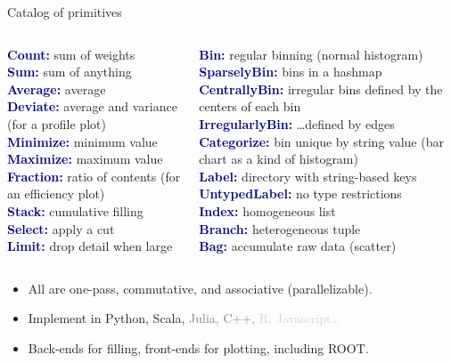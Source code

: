 \documentclass{beamer}
\begin{document}
\begin{frame}{Catalog of primitives}

\vspace{0.5 cm}
\begin{columns}
\textcolor{darkblue}{\bf Count:} sum of weights \\
\textcolor{darkblue}{\bf Sum:} sum of anything \\
\textcolor{darkblue}{\bf Average:} average \\
\textcolor{darkblue}{\bf Deviate:} average and variance (for a profile plot) \\
\textcolor{darkblue}{\bf Minimize:} minimum value \\
\textcolor{darkblue}{\bf Maximize:} maximum value \\
\textcolor{darkblue}{\bf Fraction:} ratio of contents (for an efficiency plot) \\
\textcolor{darkblue}{\bf Stack:} cumulative filling \\
\textcolor{darkblue}{\bf Select:} apply a cut \\
\textcolor{darkblue}{\bf Limit:} drop detail when large

\textcolor{darkblue}{\bf Bin:} regular binning (normal histogram) \\
\textcolor{darkblue}{\bf SparselyBin:} bins in a hashmap \\
\textcolor{darkblue}{\bf CentrallyBin:} irregular bins defined by the centers of each bin \\
\textcolor{darkblue}{\bf IrregularlyBin:} \ldots defined by edges \\
\textcolor{darkblue}{\bf Categorize:} bin unique by string value (bar chart as a kind of histogram) \\
\textcolor{darkblue}{\bf Label:} directory with string-based keys \\
\textcolor{darkblue}{\bf UntypedLabel:} no type restrictions \\
\textcolor{darkblue}{\bf Index:} homogeneous list \\
\textcolor{darkblue}{\bf Branch:} heterogeneous tuple \\
\textcolor{darkblue}{\bf Bag:} accumulate raw data (scatter) \\
\end{columns}

\vspace{0.25 cm}
\begin{itemize}
\item All are one-pass, commutative, and associative (parallelizable).
\item Implement in Python, Scala, \textcolor{gray}{Julia, C++,} \textcolor{lightgray}{R, Javascript\ldots}
\item Back-ends for filling, front-ends for plotting, including ROOT.
\end{itemize}
\end{frame}
\end{document}

